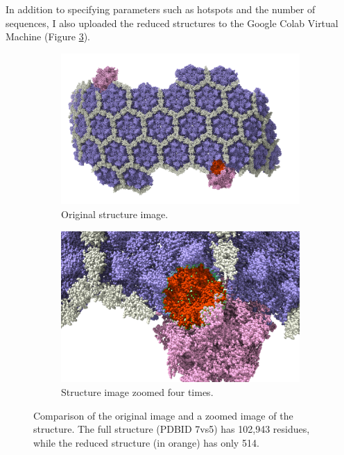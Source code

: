 \documentclass[11pt,a4paper]{article}
\begin{document}
In addition to specifying parameters such as hotspots and the number of sequences, I also uploaded the reduced structures to the Google Colab Virtual Machine (Figure \ref{fig:comparison}).

\begin{figure}[ht]
    \centering
    \begin{subfigure}[b]{0.45\textwidth}
        \includegraphics[width=\textwidth]{Supplementary Data/Figures/Full_image.png}
        \caption{Original structure image.}
        \label{fig:full_image}
    \end{subfigure}
    \hfill
    \begin{subfigure}[b]{0.45\textwidth}
        \includegraphics[width=\textwidth]{Supplementary Data/Figures/zoom_4.png}
        \caption{Structure image zoomed four times.}
        \label{fig:zoom_4}
    \end{subfigure}
    \caption{Comparison of the original image and a zoomed image of the structure. The full structure (PDBID 7vs5) has 102,943 residues, while the reduced structure (in orange) has only 514.}
    \label{fig:comparison}
\end{figure}
\end{document}
